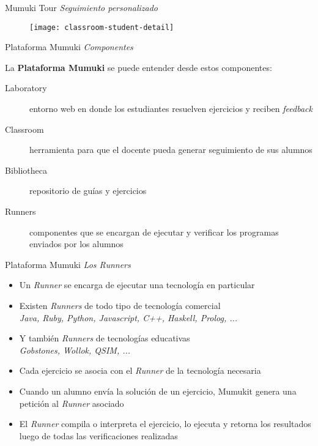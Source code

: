 \documentclass{beamer}
\begin{document}
\begin{frame}
    {Mumuki Tour}
    {\emph{Seguimiento personalizado}}

    \begin{figure}[h]
        \texttt{[image: classroom-student-detail]}
    \end{figure}
\end{frame}

\begin{frame}
    {Plataforma Mumuki}
    {\emph{Componentes}}

    La \textbf{Plataforma Mumuki} se puede entender desde estos componentes:

    \vspace{1.5em}

    \begin{description}
        \item[Laboratory] entorno web en donde los estudiantes resuelven ejercicios
        y reciben \emph{feedback}
        \item[Classroom] herramienta para que el docente pueda generar seguimiento de sus alumnos
        \item[Bibliotheca] repositorio de guías y ejercicios
        \item[Runners] componentes que se encargan de ejecutar y verificar los programas enviados por los alumnos
    \end{description}


\end{frame}


\begin{frame}
    {Plataforma Mumuki}
    {\emph{Los Runners}}

    \begin{itemize}
        \item Un \emph{Runner} se encarga de ejecutar una tecnología en particular
        \item Existen \emph{Runners} de todo tipo de tecnología comercial \\
        {\footnotesize\emph{Java, Ruby, Python, Javascript, C++, Haskell, Prolog, ...}}
        \item Y también \emph{Runners} de tecnologías educativas \\
        {\footnotesize\emph{Gobstones, Wollok, QSIM, ...}}
        \item Cada ejercicio se asocia con el \emph{Runner} de la tecnología necesaria
        \item Cuando un alumno envía la solución de un ejercicio, Mumukit
        genera una petición al \emph{Runner} asociado
        \item El \emph{Runner} compila o interpreta el ejercicio, lo ejecuta y retorna
        los resultados luego de todas las verificaciones realizadas
    \end{itemize}
\end{frame}
\end{document}
